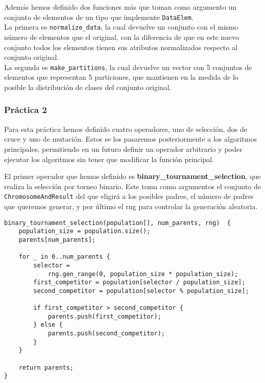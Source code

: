 \documentclass[size=a4, parskip=half, titlepage=false, toc=flat, toc=bib, 12pt]{scrartcl}
\begin{document}
Además hemos definido dos funciones más que toman como argumento un conjunto de elementos de un tipo que implemente \texttt{DataElem}.\\

La primera es \texttt{normalize\_data}, la cual devuelve un conjunto con el mismo número de elementos que el original, con la diferencia de que en este nuevo conjunto todos los elementos tienen sus atributos normalizados respecto al conjunto original. \\

La segunda es \texttt{make\_partitions}, la cual devuelve un vector con 5 conjuntos de elementos que representan 5 particiones, que mantienen en la medida de lo posible la distribución de clases del conjunto original.\\

\subsubsection{Práctica 2}
Para esta práctica hemos definido cuatro operadores, uno de selección, dos de cruce y uno de mutación. Estos se los pasaremos posteriormente a los algoritmos principales, permitiendo en un futuro definir un operador arbitrario y poder ejecutar los algoritmos sin tener que modificar la función principal.

El primer operador que hemos definido es \textbf{binary\_tournament\_selection}, que realiza la selección por torneo binario. Este toma como argumentos el conjunto de \texttt{ChromosomeAndResult} del que eligirá a los posibles padres, el número de padres que queremos generar, y por último el rng para controlar la generación aleatoria.

\begin{verbatim}
binary_tournament_selection(population[], num_parents, rng)  {
    population_size = population.size();
    parents[num_parents];

    for _ in 0..num_parents {
        selector =
            rng.gen_range(0, population_size * population_size);
        first_competitor = population[selector / population_size];
        second_competitor = population[selector % population_size];

        if first_competitor > second_competitor {
            parents.push(first_competitor);
        } else {
            parents.push(second_competitor);
        }
    }

    return parents;
}

\end{verbatim}
\end{document}
